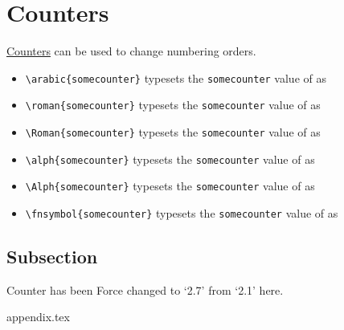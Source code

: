\documentclass{report}[a4paper,12pt] %
\begin{document}
\section{Counters}
\href{https://www.overleaf.com/learn/latex/Counters}{Counters} can be used to change numbering orders.

\setcounter{somecounter}{9}
\begin{itemize}
    \item \verb|\arabic{somecounter}| typesets the \texttt{somecounter} value of  \thesomecounter{} as  
    \item \verb|\roman{somecounter}| typesets the \texttt{somecounter} value of  \thesomecounter{} as  
    \item \verb|\Roman{somecounter}| typesets the \texttt{somecounter} value of  \thesomecounter{} as  
    \item \verb|\alph{somecounter}| typesets the \texttt{somecounter} value of  \thesomecounter{} as  
   \item \verb|\Alph{somecounter}| typesets the \texttt{somecounter} value of  \thesomecounter{} as  
    \item \verb|\fnsymbol{somecounter}| typesets the \texttt{somecounter} value of  \thesomecounter{} as  
\end{itemize}

\setcounter{subsection}{6}
\subsection{Subsection}
Counter has been Force changed to `2.7' from `2.1' here.

{appendix.tex}
\end{document}
